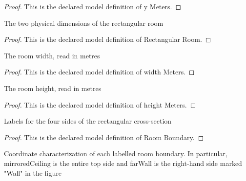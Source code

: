 \begin{proof}
  This is the declared model definition of y Meters.
\end{proof}
\begin{definition}
  \label{def:physics:phyx-mini-0063:phyxminiproblems-problemphyxmini0063-rectangularroom}
  The two physical dimensions of the rectangular room
\end{definition}
\begin{proof}
  This is the declared model definition of Rectangular Room.
\end{proof}
\begin{definition}
  \label{def:physics:phyx-mini-0063:phyxminiproblems-problemphyxmini0063-rectangularroom-widthmeters}
  The room width, read in metres
\end{definition}
\begin{proof}
  This is the declared model definition of width Meters.
\end{proof}
\begin{definition}
  \label{def:physics:phyx-mini-0063:phyxminiproblems-problemphyxmini0063-rectangularroom-heightmeters}
  The room height, read in metres
\end{definition}
\begin{proof}
  This is the declared model definition of height Meters.
\end{proof}
\begin{definition}
  \label{def:physics:phyx-mini-0063:phyxminiproblems-problemphyxmini0063-roomboundary}
  Labels for the four sides of the rectangular cross-section
\end{definition}
\begin{proof}
  This is the declared model definition of Room Boundary.
\end{proof}
\begin{definition}
  \label{def:physics:phyx-mini-0063:phyxminiproblems-problemphyxmini0063-liesonboundary}
  Coordinate characterization of each labelled room boundary. In particular, mirroredCeiling is the entire top side and farWall is the right-hand side marked "Wall" in the figure
\end{definition}

